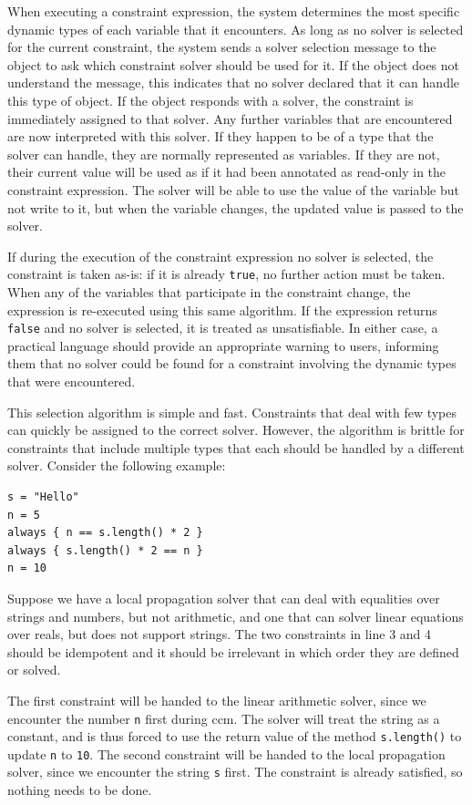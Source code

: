 \documentclass[numbers]{sigplanconf}
\begin{document}
When executing a constraint expression, the system determines the most specific
dynamic types of each variable that it encounters. As long as no solver is
selected for the current constraint, the system sends a solver selection message
to the object to ask which constraint solver should be used for it. If the
object does not understand the message, this indicates that no solver declared
that it can handle this type of object. If the object responds with a solver,
the constraint is immediately assigned to that solver. Any further variables
that are encountered are now interpreted with this solver. If they happen to be
of a type that the solver can handle, they are normally represented as
variables. If they are not, their current value will be used as if it had been
annotated as read-only in the constraint expression. The solver will be able to
use the value of the variable but not write to it, but when the variable
changes, the updated value is passed to the solver.

If during the execution of the constraint expression no solver is
selected, the constraint is taken as-is: if it is already \verb!true!,
no further action must be taken. When any of the variables that
participate in the constraint change, the expression is re-executed
using this same algorithm. If the expression returns \verb!false! and
no solver is selected, it is treated as unsatisfiable. In either case,
a practical language should provide an appropriate warning to users,
informing them that no solver could be found for a constraint
involving the dynamic types that were encountered.

This selection algorithm is simple and fast. Constraints that deal
with few types can quickly be assigned to the correct solver. However,
the algorithm is brittle for constraints that include multiple types
that each should be handled by a different solver. Consider the
following example:
\begin{lstlisting}
s = "Hello"
n = 5
always { n == s.length() * 2 }
always { s.length() * 2 == n }
n = 10
\end{lstlisting}
Suppose we have a local propagation solver that can deal with
equalities over strings and numbers, but not arithmetic, and one that
can solver linear equations over reals, but does not support
strings. The two constraints in line 3 and 4 should be idempotent and
it should be irrelevant in which order they are defined or solved.

The first constraint will be handed to the linear arithmetic solver,
since we encounter the number \verb!n! first during \gls{ccm}. The
solver will treat the string as a constant, and is thus forced to use
the return value of the method \verb!s.length()! to update \verb!n! to
\verb!10!. The second constraint will be handed to the local
propagation solver, since we encounter the string \verb!s! first. The
constraint is already satisfied, so nothing needs to be done.
\end{document}
